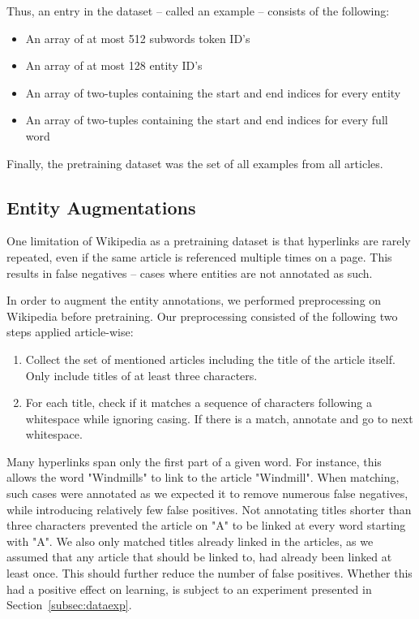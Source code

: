 \documentclass[main.tex]{subfiles}
\begin{document}
Thus, an entry in the dataset -- called an example -- consists of the following:
\begin{itemize}
    \item An array of at most 512 subwords token ID's
    \item An array of at most 128 entity ID's
    \item An array of two-tuples containing the start and end indices for every entity
    \item An array of two-tuples containing the start and end indices for every full word
\end{itemize}
Finally, the pretraining dataset was the set of all examples from all articles.

\subsection{Entity Augmentations}
\label{subsec:entaug}
One limitation of Wikipedia as a pretraining dataset is that hyperlinks are rarely repeated, even if the same article is referenced multiple times on a page.
This results in false negatives -- cases where entities are not annotated as such.

In order to augment the entity annotations, we performed preprocessing on Wikipedia before pretraining.
Our preprocessing consisted of the following two steps applied article-wise:
\begin{enumerate}
    \item Collect the set of mentioned articles including the title of the article itself.
    Only include titles of at least three characters.
    \item For each title, check if it matches a sequence of characters following a whitespace while ignoring casing.
    If there is a match, annotate and go to next whitespace.
\end{enumerate}
Many hyperlinks span only the first part of a given word.
For instance, this allows the word "Windmills" to link to the article "Windmill".
When matching, such cases were annotated as we expected it to remove numerous false negatives, while introducing relatively few false positives.
Not annotating titles shorter than three characters prevented the article on "A" to be linked at every word starting with "A".
We also only matched titles already linked in the articles, as we assumed that any article that should be linked to, had already been linked at least once.
This should further reduce the number of false positives.
Whether this had a positive effect on learning, is subject to an experiment presented in Section~\ref{subsec:dataexp}.
\end{document}
